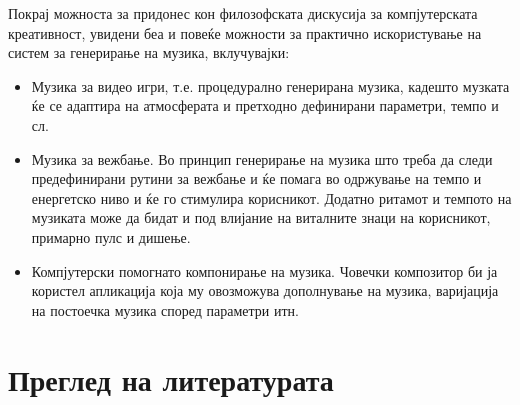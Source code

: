 Покрај можноста за придонес кон филозофската дискусија за компјутерската креативност, увидени беа и повеќе можности за практично искористување на систем за генерирање на музика, вклучувајки:
\begin{itemize}
\item Музика за видео игри, т.е. процедурално генерирана музика, кадешто музката ќе се адаптира на атмосферата и претходно дефинирани параметри, темпо и сл.
\item Музика за вежбање. Во принцип генерирање на музика што треба да следи предефинирани рутини за вежбање и ќе помага во одржување на темпо и енергетско ниво и ќе го стимулира корисникот. Додатно ритамот и темпото на музиката може да бидат и под влијание на виталните знаци на корисникот, примарно пулс и дишење.
\item Компјутерски помогнато компонирање на музика. Човечки композитор би ја користел апликација која му овозможува дополнување на музика, варијација на постоечка музика според параметри итн.
\end{itemize}

\chapter{Преглед на литературата}
\label{ch:pregled}

